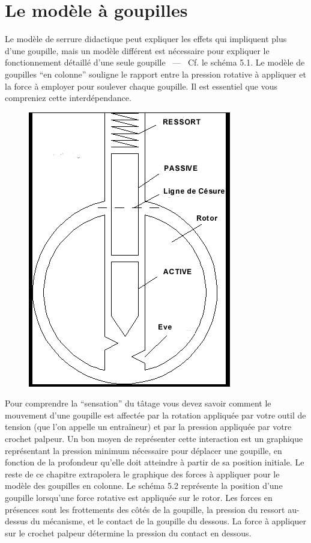 \documentclass[a4paper,french,11pt,twoside]{report}
\begin{document}
\chapter{Le modèle à goupilles}

Le modèle de serrure didactique peut expliquer les effets qui impliquent plus d'une goupille, mais un modèle différent est nécessaire pour expliquer le fonctionnement détaillé d'une seule goupille ~---~ Cf. le schéma 5.1. Le modèle de goupilles \enquote{en colonne} souligne le rapport entre la pression rotative à appliquer et la force à employer pour soulever chaque goupille. Il est essentiel que vous compreniez cette interdépendance.

\begin{figure}[h] \begin{center}
        \includegraphics[scale=0.6]{images/Image9}
        \caption{}
\end{center} \end{figure}

Pour comprendre la \enquote{sensation} du tâtage vous devez savoir comment le mouvement d'une goupille est affectée par la rotation appliquée par votre outil de tension (que l'on appelle un entraîneur) et par la pression appliquée par votre crochet palpeur. Un bon moyen de représenter cette interaction est un graphique représentant la pression minimum nécessaire pour déplacer une goupille, en fonction de la profondeur qu'elle doit atteindre à partir de sa position initiale. Le reste de ce chapitre extrapolera le graphique des forces à appliquer pour le modèle des goupilles en colonne. Le schéma 5.2 représente la position d'une goupille lorsqu'une force rotative est appliquée sur le rotor. Les forces en présences sont les frottements des côtés de la goupille, la pression du ressort au-dessus du mécanisme, et le contact de la goupille du dessous. La force à appliquer sur le crochet palpeur détermine la pression du contact en dessous.
\end{document}
